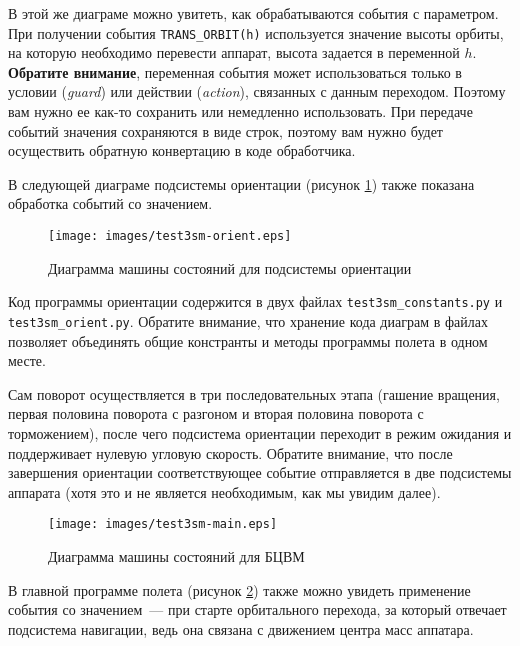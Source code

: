 \documentclass[12pt,a4paper]{article}
\begin{document}
В этой же диаграме можно увитеть, как обрабатываются события с параметром. При получении
события \verb'TRANS_ORBIT(h)' используется значение высоты орбиты, на которую необходимо
перевести аппарат, высота задается в переменной $h$. \textbf{Обратите внимание},
переменная события может использоваться только в условии (\emph{guard}) или действии
(\emph{action}), связанных с данным переходом. Поэтому вам нужно ее как-то сохранить или
немедленно использовать. При передаче событий значения сохраняются в виде строк, поэтому
вам нужно будет осуществить обратную конвертацию в коде обработчика.

В следующей диаграме подсистемы ориентации (рисунок \ref{Pic:Test3SM-Orient}) также показана
обработка событий со значением.

\begin{figure}[tbh]
  \begin{center}
    \texttt{[image: images/test3sm-orient.eps]}
    \caption{Диаграмма машины состояний для подсистемы ориентации}
    \label{Pic:Test3SM-Orient}
  \end{center}
\end{figure}

Код программы ориентации содержится в двух файлах \verb'test3sm_constants.py' и
\verb'test3sm_orient.py'. Обратите внимание, что хранение кода диаграм в файлах позволяет
объединять общие констранты и методы программы полета в одном месте.

Сам поворот осуществляется в три последовательных этапа (гашение вращения, первая половина
поворота с разгоном и вторая половина поворота с торможением), после чего подсистема
ориентации переходит в режим ожидания и поддерживает нулевую угловую скорость. Обратите
внимание, что после завершения ориентации соответствующее событие отправляется в две
подсистемы аппарата (хотя это и не является необходимым, как мы увидим далее).

\begin{figure}[tbh]
  \begin{center}
    \texttt{[image: images/test3sm-main.eps]}
    \caption{Диаграмма машины состояний для БЦВМ}
    \label{Pic:Test3SM-Main}
  \end{center}
\end{figure}

В главной программе полета (рисунок \ref{Pic:Test3SM-Main}) также можно увидеть применение
события со значением~--- при старте орбитального перехода, за который отвечает подсистема
навигации, ведь она связана с движением центра масс аппатара.
\end{document}
